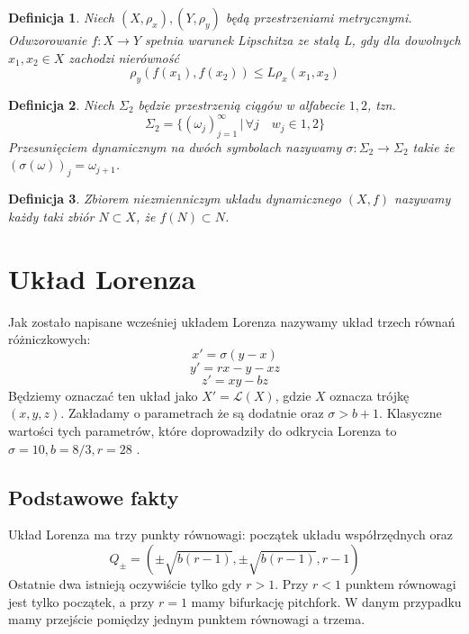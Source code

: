 \documentclass[12pt]{report}
\newtheorem{definition}{Definicja}
\begin{document}
	\begin{definition}
		Niech $(X, \rho_x), (Y, \rho_y)$ będą przestrzeniami metrycznymi. Odwzorowanie $f: X \to Y$ spełnia warunek Lipschitza ze stałą L, gdy dla dowolnych $x_1, x_2 \in X$ zachodzi nierówność
		\[ \rho_y(f(x_1), f(x_2)) \le L \rho_x(x_1, x_2) \]
	\end{definition}
	\begin{definition}
		Niech $\Sigma_2$ będzie przestrzenią ciągów w alfabecie ${1, 2}$, tzn.
			\[ \Sigma_2 = \{(\omega_j)^{\infty}_{j=1}\, |\, \forall j \quad w_j \in {1, 2}\} \]
		Przesunięciem dynamicznym na dwóch symbolach nazywamy $\sigma : \Sigma_2 \to \Sigma_2$ takie że $(\sigma(\omega))_j = \omega_{j+1}$.
	\end{definition}
	\begin{definition}
		Zbiorem niezmienniczym układu dynamicznego $(X, f)$ nazywamy każdy taki zbiór $N \subset X$, że $f(N) \subset N$.
	\end{definition}

\chapter{Układ Lorenza}
	\par Jak zostało napisane wcześniej układem Lorenza nazywamy układ trzech równań różniczkowych:
		\[ x' = \sigma (y - x) \]
		\[ y' = rx - y - xz \]
		\[ z' = xy - bz \]
	Będziemy oznaczać ten układ jako $X' = \mathcal{L}(X)$, gdzie $X$ oznacza trójkę $(x, y, z)$. Zakładamy o parametrach że są dodatnie oraz $\sigma > b + 1$. Klasyczne wartości tych parametrów, które doprowadziły do odkrycia Lorenza to $\sigma = 10, b = 8/3, r = 28$ \cite{Lorenz}.

	\section{Podstawowe fakty}
	\par Układ Lorenza ma trzy punkty równowagi: początek układu współrzędnych oraz
		\[ Q_{\pm} = (\pm \sqrt{b(r - 1)}, \pm \sqrt{b(r - 1)}, r - 1) \]
	Ostatnie dwa istnieją oczywiście tylko gdy $r > 1$. Przy $r < 1$ punktem równowagi jest tylko początek, a przy $r = 1$ mamy bifurkację pitchfork. W danym przypadku mamy przejście pomiędzy jednym punktem równowagi a trzema.
	
\end{document}
